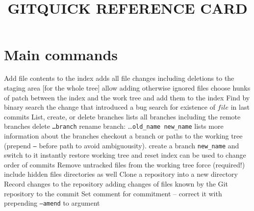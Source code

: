 
\def\content{GIT}
\def\versionnumber{1.1}  %
\def\year{2014}
\def\month{May}
\def\version{v\versionnumber\ \month\ \year}



\title{\content QUICK REFERENCE CARD}

\shortintro

\section{Main commands}{}
	{Add file contents to the index}
	{adds all file changes including deletions to the staging area [for the whole tree]}
	{allow adding otherwise ignored files}
	{choose hunks of patch between the index and the work tree and add them to the index}
	{Find by binary search the change that introduced a bug}
	{search for existence of $file$ in last commits}
	{List, create, or delete branches}
	{lists all branches including the remote branches}
	{delete {\tt \dots branch}}
	{rename branch: \dots {\tt old\_name new\_name}}
	{lists more information about the branches}
	{checkout a branch or paths to the working tree (prepend {\tt --} before path to avoid ambiguousity).}
	{create a branch {\tt new\_name} and switch to it instantly}
	{restore working tree and reset index}
	{can be used to change order of commits}
	{Remove untracked files from the working tree}
	{force (required!)}
	{include hidden files}
	{directories as well}
	{Clone a repository into a new directory}
	{Record changes to the repository}
	{adding changes of files known by the Git repository to the commit}
	{Set comment for commitment -- correct it with prepending {\tt --amend} to argument}
